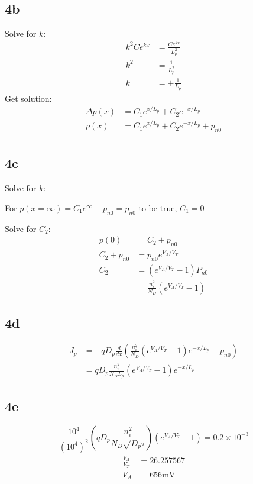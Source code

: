 \documentclass{article}
\begin{document}
\begin{multicols}{2}
    \subsection*{4b}
    Solve for \(k\):
    \begin{align*}
        k^2 C e^{kx} & = \frac{C e^{kx}}{L_p^2} \\
        k^2          & = \frac{1}{L_p^2}        \\
        k            & = \pm\frac{1}{L_p}
    \end{align*}
    Get solution:
    \begin{align*}
        \Delta p(x) & = C_1 e^{x/L_p} + C_2 e^{-x/L_p}          \\
        p(x)        & = C_1 e^{x/L_p} + C_2 e^{-x/L_p} + p_{n0} \\
    \end{align*}

    \subsection*{4c}
    Solve for \(k\):

    For
    \(p(x=\infty) = C_1 e^{\infty} + p_{n0} = p_{n0}\)
    to be true,
    \(C_1 = 0\)

    Solve for \(C_2\):
    \begin{align*}
        p(0)         & = C_2 + p_{n0}                                     \\
        C_2 + p_{n0} & = p_{n0} e^{V_A/V_T}                               \\
        C_2          & = \left( e^{V_A/V_T} - 1 \right) P_{n0}            \\
                     & = \frac{n_i^2}{N_D} \left( e^{V_A/V_T} - 1 \right)
    \end{align*}
    \subsection*{4d}
    \begin{align*}
        J_p & = - q D_p \frac{d}{dx}\left( \frac{n_i^2}{N_D} \left( e^{V_A/V_T} - 1 \right) e^{-x/L_p} + p_{n0} \right) \\
            & = q D_p \frac{n_i^2}{N_D L_p}  \left( e^{V_A/V_T} - 1 \right) e^{-x/L_p}
    \end{align*}
    \subsection*{4e}
    \[\frac{10^4}{{\left(10^4\right)}^2} \left( q D_p \frac{n_i^2}{N_D\sqrt{D_p \tau}} \right)\left( e^{V_A/V_T} -1 \right)  = 0.2\times 10^{-3}\]
    \begin{align*}
        \frac{V_A}{V_T} & = 26.257567            \\
        V_A             & = 656 \si{\milli\volt}
    \end{align*}
\end{multicols}
\end{document}
